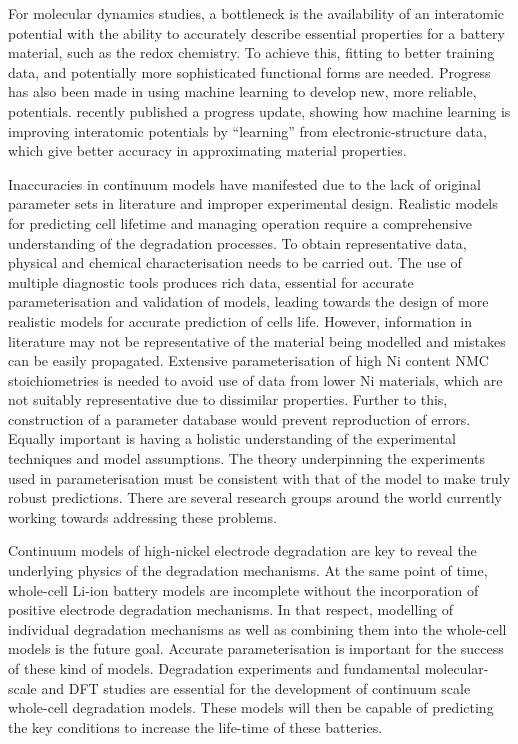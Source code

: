 \documentclass[aps,prb,twocolumn,superscriptaddress,reprint]{revtex4-1}
\begin{document}
For molecular dynamics studies, a bottleneck is the availability of an interatomic potential with the ability to accurately describe essential properties for a battery material, such as the redox chemistry. To achieve this, fitting to better training data, and potentially more sophisticated functional forms are needed. Progress has also been made in using machine learning to develop new, more reliable, potentials. \citeauthor{deringer2019machine} recently published a progress update, showing how machine learning is improving interatomic potentials by ``learning'' from electronic-structure data, which give better accuracy in approximating material properties. \cite{deringer2019machine}

Inaccuracies in continuum models have manifested due to the lack of original parameter sets in literature and improper experimental design. Realistic models for predicting cell lifetime and managing operation require a comprehensive understanding of the degradation processes. To obtain representative data, physical and chemical characterisation needs to be carried out. The use of multiple diagnostic tools produces rich data, essential for accurate parameterisation and validation of models, leading towards the design of more realistic models for accurate prediction of cells life. However, information in literature may not be representative of the material being modelled and mistakes can be easily propagated.\cite{Howey_2020} Extensive parameterisation of high Ni content NMC stoichiometries is needed to avoid use of data from lower Ni materials, which are not suitably representative due to dissimilar properties. Further to this, construction of a parameter database would prevent reproduction of errors. Equally important is having a holistic understanding of the experimental techniques and model assumptions. The theory underpinning the experiments used in parameterisation must be consistent with that of the model to make truly robust predictions. There are several research groups around the world currently working towards addressing these problems.

Continuum models of high-nickel electrode degradation are key to reveal the underlying physics of the degradation mechanisms. At the same point of time, whole-cell Li-ion battery models are incomplete without the incorporation of positive electrode degradation mechanisms. In that respect, modelling of individual degradation mechanisms as well as combining them into the whole-cell models is the future goal. Accurate parameterisation is important for the success of these kind of models. Degradation experiments and fundamental molecular-scale and DFT studies are essential for the development of continuum scale whole-cell degradation models.\cite{Sulzer_2020} These models will then be capable of predicting the key conditions to increase the life-time of these batteries.
\end{document}
